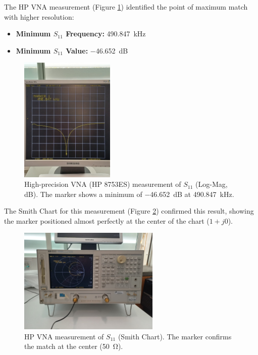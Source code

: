 The HP VNA measurement (Figure \ref{fig:vna_logmag}) identified the point of maximum match with higher resolution:
\begin{itemize}
    \item \textbf{Minimum $S_{11}$ Frequency:} \SI{490.847}{\kilo\hertz}
    \item \textbf{Minimum $S_{11}$ Value:} \SI{-46.652}{\deci\bel}
\end{itemize}

\begin{figure}[H]
    \centering
    \includegraphics[width=0.4\textwidth]{Images/vna_s11_logmag.jpeg}
    \caption{High-precision VNA (HP 8753ES) measurement of $S_{11}$ (Log-Mag, dB). The marker shows a minimum of \SI{-46.652}{\deci\bel} at \SI{490.847}{\kilo\hertz}.}
    \label{fig:vna_logmag}
\end{figure}

The Smith Chart for this measurement (Figure \ref{fig:vna_smith}) confirmed this result, showing the marker positioned almost perfectly at the center of the chart ($1+j0$).

\begin{figure}[H]
    \centering
    \includegraphics[width=0.6\textwidth]{Images/vna_s11_smith.jpeg}
    \caption{HP VNA measurement of $S_{11}$ (Smith Chart). The marker confirms the match at the center (\SI{50}{\ohm}).}
    \label{fig:vna_smith}
\end{figure}


